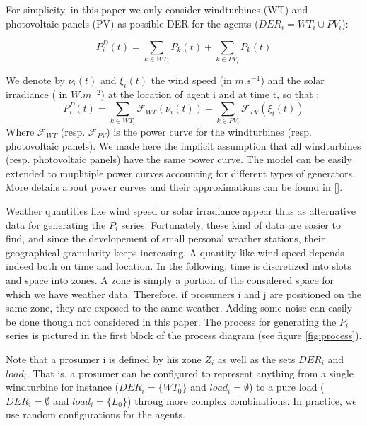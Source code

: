 \documentclass[conference]{IEEEtran}
\begin{document}
For simplicity, in this paper we only consider windturbines (WT) and photovoltaic panels (PV) as possible DER for the agents ($ DER_{i} = WT_{i} \cup PV_{i} $):  

\begin{equation}
P_{i}^{D}(t) = \sum_{k \in WT_{i}} P_{k}(t) + \sum_{k \in PV_{i}} P_{k}(t)
\end{equation} 

We denote by $ \nu_{i}(t) $ and $ \xi_{i}(t) $ the wind speed (in $ m.s^{-1} $) and the solar irradiance ( in $ W.m^{-2} $) at the location of agent i and at time t, so that :
\begin{equation}
 P_{i}^{P}(t) = \sum_{k \in WT_{i}} \mathcal{F}_{WT}( \nu_{i}(t) ) + \sum_{k \in PV_{i} } \mathcal{F}_{PV}(\xi_{i}(t) ) 
\end{equation}
Where $ \mathcal{F}_{WT} $ (resp. $ \mathcal{F}_{PV} $) is the power curve for the windturbines (resp. photovoltaic panels). We made here the implicit assumption that all windturbines (resp. photovoltaic panels) have the same power curve. The model can be easily extended to muplitiple power curves accounting for different types of generators. More details about power curves and their approximations can be found in []. 

Weather quantities like wind speed or solar irradiance appear thus as alternative data for generating the $ P_{i} $ series. Fortunately, these kind of data are easier to find, and since the developement of small personal weather stations, their geographical granularity keeps increasing.  A quantity like wind speed depends indeed both on time and location. In the following, time is discretized into slots and space into zones. A zone is simply a portion of the considered space for which we have weather data. Therefore, if prosumers i and j are positioned on the same zone, they are exposed to the same weather. Adding some noise can easily be done though not considered in this paper. The process for generating the $ P_{i} $ series is pictured in the first block of the process diagram (see figure \ref{fig:process}).

Note that a prosumer i is defined by his zone $ Z_{i} $ as well as the sets $ DER_{i} $ and $ load_{i} $. That is, a prosumer can be configured to represent anything from a single windturbine for instance ($ DER_{i} = \{ WT_{0} \} $ and $ load_{i} = \emptyset $) to a pure load ($ DER_{i} = \emptyset $ and $ load_{i} = \{ L_{0} \} $) throug more complex combinations. In practice, we use random configurations for the agents.
\end{document}
